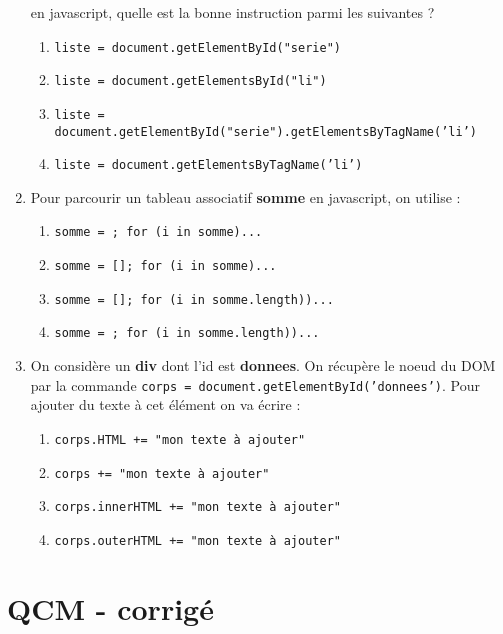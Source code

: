 \documentclass[]{scrartcl}
\begin{document}
\begin{enumerate}
    en javascript, quelle est la bonne instruction parmi les suivantes ?
    \begin{enumerate}
      \item \texttt{liste = document.getElementById("serie")}
      \item \texttt{liste = document.getElementsById("li")}
      \item \texttt{liste = document.getElementById("serie").getElementsByTagName('li')}
      \item \texttt{liste = document.getElementsByTagName('li')}
    \end{enumerate}
    \item Pour parcourir un tableau associatif \textbf{somme} en javascript, on utilise :
    \begin{enumerate}
      \item \texttt{somme = {}; for (i in somme){...} }
      \item \texttt{somme = []; for (i in somme){...} }
      \item \texttt{somme = []; for (i in somme.length)){...} }
      \item \texttt{somme = {}; for (i in somme.length)){...} }
    \end{enumerate}
 \item On considère un \textbf{div} dont l'id est \textbf{donnees}. On récupère le noeud du DOM par la commande \texttt{corps = document.getElementById('donnees')}. Pour ajouter du texte à cet élément on va écrire :
    \begin{enumerate}
      \item \texttt{corps.HTML += "mon texte à ajouter"}
      \item \texttt{corps += "mon texte à ajouter"}
      \item \texttt{corps.innerHTML += "mon texte à ajouter"}
      \item \texttt{corps.outerHTML += "mon texte à ajouter"}
    \end{enumerate}
\end{enumerate}
\newpage
\section*{QCM - corrigé}
\end{document}
